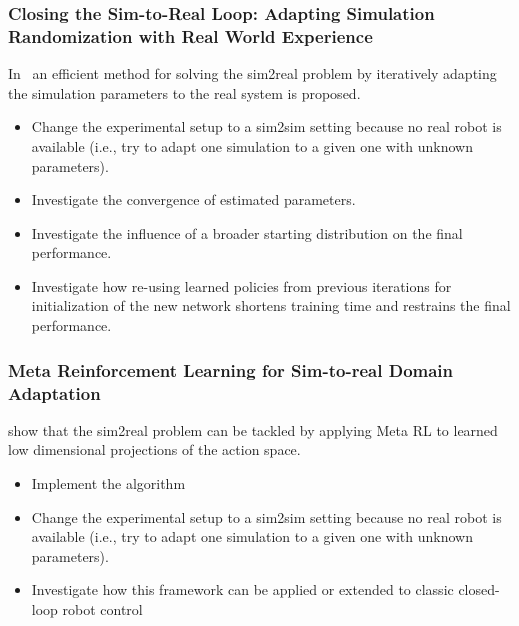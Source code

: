 \documentclass[a4paper]{article}
\begin{document}

\subsubsection{Closing the Sim-to-Real Loop: Adapting Simulation Randomization with Real World Experience}
In~\cite{Chebotar2018} an efficient method for solving the sim2real problem by iteratively adapting the simulation parameters to the real system is proposed.
\begin{itemize}
  \item Change the experimental setup to a sim2sim setting because no real robot is available (i.e., try to adapt one simulation to a given one with unknown parameters).
  \item Investigate the convergence of estimated parameters.
  \item Investigate the influence of a broader starting distribution on the final performance.
  \item Investigate how re-using learned policies from previous iterations for initialization of the new network shortens training time and restrains the final performance.
\end{itemize}

\subsubsection{Meta Reinforcement Learning for Sim-to-real Domain Adaptation}
\cite{Arndt19} show that the sim2real problem can be tackled by applying Meta RL to learned low dimensional projections of the action space.
\begin{itemize}
  \item Implement the algorithm
  \item Change the experimental setup to a sim2sim setting because no real robot is available (i.e., try to adapt one simulation to a given one with unknown parameters).
  \item Investigate how this framework can be applied or extended to classic closed-loop robot control
\end{itemize}
\end{document}
